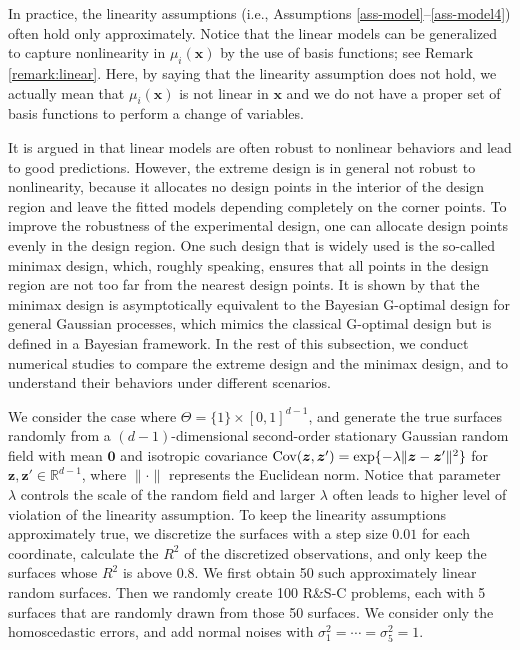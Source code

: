 \documentclass[ijoc,nonblindrev]{informs3}
\def\Cov{{\rm Cov}}
\def\bx{{\bm x}}
\def\bz{{\bm z}}
\begin{document}
In practice, the linearity assumptions (i.e., Assumptions \ref{ass-model}--\ref{ass-model4}) often hold only approximately.
Notice that the linear models can be generalized to capture nonlinearity in $\mu_i(\bx)$ by the use of basis functions; see Remark \ref{remark:linear}.
Here, by saying that the linearity assumption does not hold, we actually mean that $\mu_i(\bx)$ is not linear in $\bx$ and we do not have a proper set of basis functions to perform a change of variables.


It is argued in \cite{james2013} that linear models are often robust to nonlinear behaviors and lead to good predictions.
However, the extreme design is in general not robust to nonlinearity, because it allocates no design points in the interior of the design region and leave the fitted models depending completely on the corner points.
To improve the robustness of the experimental design, one can allocate design points evenly in the design region.
One such design that is widely used is the so-called minimax design, which, roughly speaking, ensures that all points in the design region are not too far from the nearest design points.
It is shown by \cite{johnson1990minimax} that the minimax design is asymptotically equivalent to the Bayesian G-optimal design for general Gaussian processes,
which mimics the classical G-optimal design but is defined in a Bayesian framework.
In the rest of this subsection, we conduct numerical studies to compare the extreme design and the minimax design, and to understand their behaviors under different scenarios.

We consider the case where $\Theta = \{1\} \times [0,1]^{d-1}$,
and generate the true surfaces randomly from a $(d-1)$-dimensional second-order stationary Gaussian random field with mean $\bm 0$
and isotropic covariance $\Cov(\bz,\bz')= \exp\{-\lambda \| \bz-\bz' \|^2 \}$ for $\bz,\bz' \in \mathbb{R}^{d-1}$, where $\| \cdot \|$ represents the Euclidean norm.
Notice that parameter $\lambda$ controls the scale of the random field and larger $\lambda$ often leads to higher level of violation of the linearity assumption.
To keep the linearity assumptions approximately true, we discretize the surfaces with a step size $0.01$ for each coordinate, calculate the $R^2$ of the discretized observations, and only keep the surfaces whose $R^2$ is above 0.8.
We first obtain 50 such approximately linear random surfaces.
Then we randomly create 100 R\&S-C problems, each with 5 surfaces that are randomly drawn from those 50 surfaces.
We consider only the homoscedastic errors, and add normal noises with $\sigma_1^2=\cdots=\sigma_5^2=1$.
\end{document}

